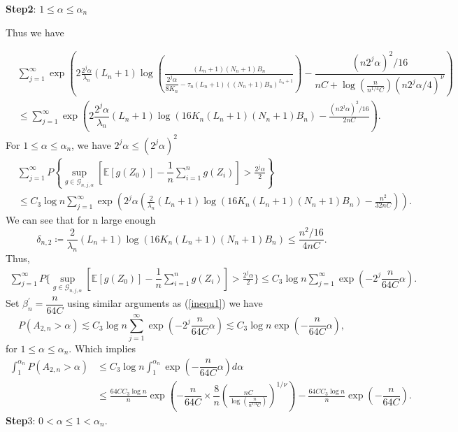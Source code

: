\documentclass[10pt,twoside]{article}
\numberwithin{equation}{section}
\newcommand{\E}{\ensuremath{\mathbb{E}}}
\begin{document}
\textbf{Step2}: $1 \leq  \alpha \leq  \alpha_{n}$ 

\medskip

Thus we have 

\medskip

\begin{align}
\nonumber & \sum_{j=1}^ {\infty}  \exp\left( 2 \frac{2^j \alpha}{\lambda_n}(L_n + 1) \log \left(\frac{ (L_n + 1)(N_n + 1) B_n}{ \dfrac{2^j
\alpha}{8 K_n} - \tau_n (L_n + 1)((N_n + 1) B_n)^{L_n +1}} \right)  - \dfrac{(n 2^j \alpha)^2 /16}{n C + \log(\frac{n}{n^ {1/4} C})(n 2^j \alpha/4)^ {\nu}} \right) 
\\
&  \leq \sum_{j=1}^ {\infty} \exp \left( 2 \dfrac{2^j \alpha}{\lambda_n}(L_n + 1) \log \left(16 K_n (L_n + 1)(N_n + 1) B_n  \right)  -\frac{(n 2^j \alpha)^2 /16}{2 n C} \right).
\end{align}
%
For $1 \leq \alpha \leq \alpha_{n}$,  we have $2^j \alpha \leq (2^j \alpha)^2$
%
\begin{align}
\nonumber & \sum_{j=1}^ {\infty} P\left\{\underset{ g \in \mathcal{G}_ {n, j, \alpha}}{\sup} \left[\E [g (Z_0)] - \dfrac{1}{n} \sum_{i=1}^ {n} g (Z_i) \right] >  \frac{2^j \alpha}{2} \right\} 
\\
& \leq C_3 \log n \sum_{j=1}^ {\infty} \exp\left( 2^j \alpha \left(\frac{2}{\lambda_n}(L_n + 1) \log \left(16 K_n (L_n + 1)(N_n + 1) B_n  \right)  -\frac{n^2}{32 n C} \right) \right).
\end{align}
%
We can see that for n large enough
%
\[  \delta_{n, 2} \coloneqq \dfrac{2}{\lambda_n}(L_n + 1)\log\left(16 K_n (L_n + 1)(N_n + 1) B_n  \right)  \leq \frac{n^2 /16}{4 n C}.  \] 
%
Thus,
%
\begin{align}
\sum_{j=1}^ {\infty} P\Big\{\underset{ g \in \mathcal{G}_ {n, j, \alpha}}{\sup} \left[\E [g (Z_0)] - \dfrac{1}{n} \sum_{i=1}^{n} g (Z_i) \right] >  \frac{2^j \alpha}{2} \Big\}
\leq C_3 \log n \sum_{j=1}^ {\infty} \exp\left( -2^j\dfrac{n}{64 C} \alpha \right).
\end{align}
%
Set $\beta_n^{'} = \dfrac{n}{64 C} $  using similar arguments as (\ref{inequ1}) we have 
%
\[P(A_ {2, n} > \alpha) \lesssim C_3 \log n \sum_{j=1}^ {\infty} \exp \left( -2^j \dfrac{n}{64 C} \alpha \right) \lesssim C_3 \log n \exp\left( - \dfrac{n}{64 C} \alpha \right),  \]
%
for $1 \leq \alpha \leq \alpha_{n}$. 
%
Which implies  
%
\begin{align}
\nonumber \int_{1}^ {\alpha_n} P(A_ {2, n} > \alpha)  & \leq C_3 \log n \int_{1}^ {\alpha_n}  \exp\left( -\dfrac{n}{64 C}\alpha \right) d \alpha  
\\
\nonumber & \leq \frac{64 C C_3\log n}{n}\exp\left(-\dfrac{n}{64 C} \times \dfrac{8}{n}\left(\frac{n C}{\log(\frac{n}{n^ {1/4} C})} \right)^{1 /\nu} \right) - \frac{64 C C_3 \log n}{n} \exp\left(-\dfrac{n}{64 C} \right).
\end{align}
%
\textbf{Step}3: $0 < \alpha\leq 1 < \alpha_n$.
%
\end{document}
